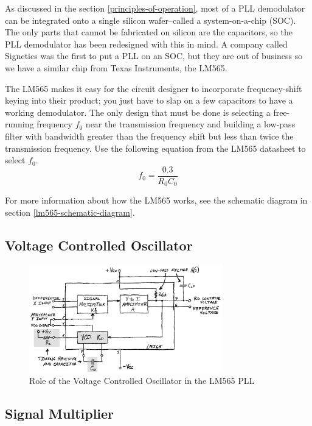 \documentclass[titlepage, letterpaper, 10.5pt]{article}
\begin{document}
As discussed in the section \ref{principles-of-operation}, most of a PLL demodulator can be integrated onto a single silicon wafer--called a system-on-a-chip (SOC).
The only parts that cannot be fabricated on silicon are the capacitors, so the PLL demodulator has been redesigned with this in mind.
A company called Signetics was the first to put a PLL on an SOC, but they are out of business so we have a similar chip from Texas Instruments, the LM565.

The LM565 makes it easy for the circuit designer to incorporate frequency-shift keying into their product; you just have to slap on a few capacitors to have a working demodulator.
The only design that must be done is selecting a free-running frequency $f_{0}$ near the transmission frequency and building a low-pass filter with bandwidth greater than the frequency shift but less than twice the transmission frequency.
Use the following equation from the LM565 datasheet to select $f_{0}$.
\begin{equation}
f_{0}=\frac{0.3}{R_{0}C_{0}}
\label{f0-eq}
\end{equation}

For more information about how the LM565 works, see the schematic diagram in section \ref{lm565-schematic-diagram}.

\clearpage
\subsection{Voltage Controlled Oscillator}

\begin{figure}[ht]
	\centering
	\includegraphics[width=0.75\textwidth]{diagrams/565-block-diagram-vco}
	\caption{Role of the Voltage Controlled Oscillator in the LM565 PLL}
	\label{565-block-diagram-vco}
\end{figure}

\clearpage
\subsection{Signal Multiplier}
\end{document}
